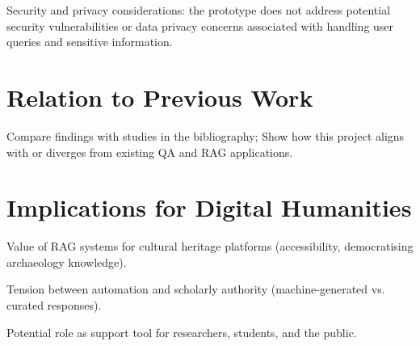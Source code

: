 \begin{spacing}{1.5}
Security and privacy considerations: the prototype does not address potential security vulnerabilities or data privacy concerns associated with handling user queries and sensitive information.

\section{Relation to Previous Work}
Compare findings with studies in the bibliography; Show how this project aligns with or diverges from existing QA and RAG applications.

\section{Implications for Digital Humanities}
Value of RAG systems for cultural heritage platforms (accessibility, democratising archaeology knowledge).

Tension between automation and scholarly authority (machine-generated vs. curated responses).

Potential role as support tool for researchers, students, and the public.

\end{spacing}